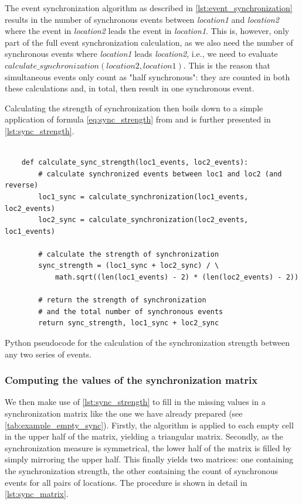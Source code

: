 The event synchronization algorithm as described in \cref{lst:event_synchronization} results in the number of synchronous events between \textit{location1} and \textit{location2} where the event in \textit{location2} leads the event in \textit{location1}. This is, however, only part of the full event synchronization calculation, as we also need the number of synchronous events where \textit{location1} leads \textit{location2}, i.e., we need to evaluate $calculate\_synchronization(location2, location1)$. This is the reason that simultaneous events only count as "half synchronous": they are counted in both these calculations and, in total, then result in one synchronous event.

Calculating the strength of synchronization then boils down to a simple application of formula \eqref{eq:sync_strength} from \pageref{eq:sync_strength} and is further presented in \cref{lst:sync_strength}.

\begin{listing}[H]
  \begin{verbatim}

    def calculate_sync_strength(loc1_events, loc2_events):
        # calculate synchronized events between loc1 and loc2 (and reverse)
        loc1_sync = calculate_synchronization(loc1_events, loc2_events)
        loc2_sync = calculate_synchronization(loc2_events, loc1_events)

        # calculate the strength of synchronization
        sync_strength = (loc1_sync + loc2_sync) / \
            math.sqrt((len(loc1_events) - 2) * (len(loc2_events) - 2))

        # return the strength of synchronization
        # and the total number of synchronous events
        return sync_strength, loc1_sync + loc2_sync

  \end{verbatim}
  \caption{Python pseudocode for the calculation of the synchronization strength between any two series of events.}
  \label{lst:sync_strength}
\end{listing}

\subsubsection{Computing the values of the synchronization matrix}
We then make use of \cref{lst:sync_strength} to fill in the missing values in a synchronization matrix like the one we have already prepared (see \cref{tab:example_empty_sync}). Firstly, the algorithm is applied to each empty cell in the upper half of the matrix, yielding a triangular matrix. Secondly, as the synchronization measure is symmetrical, the lower half of the matrix is filled by simply mirroring the upper half. This finally yields two matrices: one containing the synchronization strength, the other containing the count of synchronous events for all pairs of locations. The procedure is shown in detail in \cref{lst:sync_matrix}.


